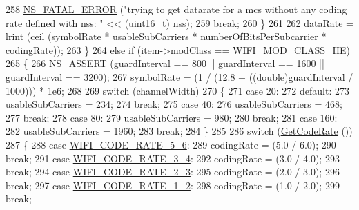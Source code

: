 \begin{DoxyCode}
258           \hyperlink{group__fatal_ga5131d5e3f75d7d4cbfd706ac456fdc85}{NS\_FATAL\_ERROR} (\textcolor{stringliteral}{"trying to get datarate for a mcs without any coding rate defined
       with nss: "} << (uint16\_t) nss);
259           \textcolor{keywordflow}{break};
260         \}
261 
262       dataRate = lrint (ceil (symbolRate * usableSubCarriers * numberOfBitsPerSubcarrier * codingRate));
263     \}
264   \textcolor{keywordflow}{else} \textcolor{keywordflow}{if} (item->modClass == \hyperlink{namespacens3_aa999e1221606a2b21b1eb33c2007c217abfa4f7272510045a9b43e8ac27ac13b0}{WIFI\_MOD\_CLASS\_HE})
265     \{
266       \hyperlink{assert_8h_a6dccdb0de9b252f60088ce281c49d052}{NS\_ASSERT} (guardInterval == 800 || guardInterval == 1600 || guardInterval == 3200);
267       symbolRate = (1 / (12.8 + ((double)guardInterval / 1000))) * 1e6;
268 
269       \textcolor{keywordflow}{switch} (channelWidth)
270         \{
271         \textcolor{keywordflow}{case} 20:
272         \textcolor{keywordflow}{default}:
273           usableSubCarriers = 234;
274           \textcolor{keywordflow}{break};
275         \textcolor{keywordflow}{case} 40:
276           usableSubCarriers = 468;
277           \textcolor{keywordflow}{break};
278         \textcolor{keywordflow}{case} 80:
279           usableSubCarriers = 980;
280           \textcolor{keywordflow}{break};
281         \textcolor{keywordflow}{case} 160:
282           usableSubCarriers = 1960;
283           \textcolor{keywordflow}{break};
284         \}
285 
286       \textcolor{keywordflow}{switch} (\hyperlink{classns3_1_1WifiMode_a41fcb1abd2aa488145f2f43ca9ba8e1d}{GetCodeRate} ())
287         \{
288         \textcolor{keywordflow}{case} \hyperlink{namespacens3_aeaf3a86fd4bdb7829955238fba43e2adaf0309d61b4cf97e5718f6d3b9fdba3aa}{WIFI\_CODE\_RATE\_5\_6}:
289           codingRate = (5.0 / 6.0);
290           \textcolor{keywordflow}{break};
291         \textcolor{keywordflow}{case} \hyperlink{namespacens3_aeaf3a86fd4bdb7829955238fba43e2ada705b2eb134214c4f87c2b07dfb59046a}{WIFI\_CODE\_RATE\_3\_4}:
292           codingRate = (3.0 / 4.0);
293           \textcolor{keywordflow}{break};
294         \textcolor{keywordflow}{case} \hyperlink{namespacens3_aeaf3a86fd4bdb7829955238fba43e2ada161e88df840a9d1ed66f6f8edd0d6415}{WIFI\_CODE\_RATE\_2\_3}:
295           codingRate = (2.0 / 3.0);
296           \textcolor{keywordflow}{break};
297         \textcolor{keywordflow}{case} \hyperlink{namespacens3_aeaf3a86fd4bdb7829955238fba43e2ada66dfa017f6a74bcb72cdccfee778e90b}{WIFI\_CODE\_RATE\_1\_2}:
298           codingRate = (1.0 / 2.0);
299           \textcolor{keywordflow}{break};

\end{DoxyCode}
